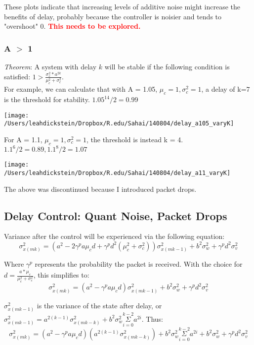 \documentclass[leqno,twocolumn]{article}
\begin{document}
These plots indicate that increasing levels of additive noise might increase the benefits of delay, probably because the controller is noisier and tends to "overshoot" 0. \textcolor{red}{\textbf{This needs to be explored.}}

\subsubsection{A $>$ 1}
\textit{Theorem}: A system with delay $k$ will be stable if the following condition is satisfied: $1 > \frac{\sigma_c^2*a^{2k}}{\mu_c^2+\sigma_c^2}$.\\

For example, we can calculate that with A = 1.05, $\mu_c = 1, \sigma_c^2 = 1$, a delay of k=7 is the threshold for stability. $1.05^{14}/2 = 0.99$

\begin{center}
\texttt{[image: /Users/leahdickstein/Dropbox/R.edu/Sahai/140804/delay\_a105\_varyK]}\end{center}

For A = 1.1, $\mu_c = 1, \sigma_c^2=1$, the threshold is instead k = 4. $1.1^6/2 = 0.89, 1.1^8/2 = 1.07$

\begin{center}
\texttt{[image: /Users/leahdickstein/Dropbox/R.edu/Sahai/140804/delay\_a11\_varyK]}\end{center}

The above was discontinued because I introduced packet drops.

\subsection{Delay Control: Quant Noise, Packet Drops}
Variance after the control will be experienced via the following equation:
\[ \sigma_{x(mk)}^2 = (a^2 -2\gamma^p a\mu_c d + \gamma^p d^2(\mu_c^2 +\sigma_c^2))\sigma_{x(mk-1)}^2 +b^2\sigma_w^2 + \gamma^p d^2\sigma_v^2 \]

Where $\gamma^p$ represents the probability the packet is received. With the choice for $d = \frac{a*\mu_c}{\mu_c^2 + \sigma_c^2}$, this simplifies to:
\[\sigma_{x(mk)}^2 = (a^2 -\gamma^p a\mu_c d)\sigma_{x(mk-1)}^2 +b^2\sigma_w^2 + \gamma^p d^2\sigma_v^2 \]

$\sigma_{x(mk-1)}^2$ is the variance of the state after delay, or $\sigma_{x(mk-1)}^2 = a^{2(k-1)}\sigma_{x(mk-k)}^2 + b^2\sigma_w^2\overset{k-2}{\underset{i=0}{\Sigma}}a^{2i}$. Thus:
\[\sigma_{x(mk)}^2 = (a^2 -\gamma^p a\mu_c d)\left(a^{2(k-1)}\sigma_{x(mk-k)}^2\right) + b^2\sigma_w^2\overset{k-2}{\underset{i=0}{\Sigma}}a^{2i} +b^2\sigma_w^2 + \gamma^p d^2\sigma_v^2 \]
\end{document}
